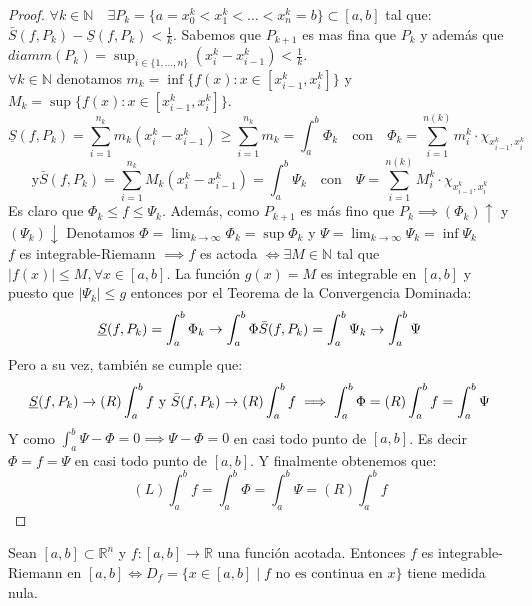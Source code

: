 \begin{proof}
    $\forall k \in \mathbb{N} \quad \exists P_k = \{ a = x_0^k < x_1^k < \dots < x_{n}^k = b \} \subset [a,b]$ tal que: $\bar{S}(f, P_k) - \underline{S}(f, P_k) < \frac{1}{k}$. 
    Sabemos que $P_{k+1}$ es mas fina que $P_{k}$ y además que $diamm(P_k) = \sup_{i \in \{1, \dots, n\}}(x_i^k - x_{i-1}^k) < \frac{1}{k}$.
    \\$\forall k \in \mathbb{N}$ denotamos $m_k = \inf\{f(x) : x \in [x_{i-1}^k, x_i^k]\}$ y $M_k = \sup\{f(x) : x \in [x_{i-1}^k, x_i^k]\}$.
    $$ \underline{S}(f, P_k) = \sum_{i=1}^{n_k}m_k(x_i^k - x_{i-1}^k) \geq \sum_{i=1}^{n_k}m_k = \int_{a}^{b}\Phi_k \quad \text{con} \quad \Phi_k = \sum_{i = 1}^{n(k)}m_i^k\cdot\chi_{x_{i-1}^k, x_i^k}$$ 
    $$\text{y} \bar{S}(f, P_k) = \sum_{i=1}^{n_k}M_k(x_i^k - x_{i-1}^k) = \int_{a}^{b} \Psi_k \quad \text{con}  \quad \Psi  = \sum_{i = 1}^{n(k)}M_i^k\cdot\chi_{x_{i-1}^k, x_i^k}$$ 
    Es claro que $\Phi_k  \leq f \leq \Psi_k$. 
    Además, como $P_{k+1}$ es más fino que $P_k \implies (\Phi_{k})\uparrow$ y $(\Psi_k)\downarrow$
    Denotamos $\Phi = \lim_{k \to \infty}\Phi_k = \sup\Phi_k$
    y $\Psi  = \lim_{k \to \infty}\Psi_k = \inf\Psi_k$
    \\$f$ es integrable-Riemann $\implies f$ es actoda $\iff \exists M \in \mathbb{N}$ tal que $|f(x)| \leq M, \forall x \in [a, b]$.
    La función  $ g(x) = M $ es integrable en $[a, b]$ y puesto que $|\Psi_k| \leq g$ entonces por el Teorema de la Convergencia Dominada: $$\underline{S}(f, P_{k}) = \int_{a}^{b}{\Phi_k} \to \int_{a}^{b}\Phi \\ \bar{S}(f, P_{k}) = \int_a^b\Psi_k \to \int_a^b\Psi$$
    Pero a su vez, también se cumple que: \\ $$\underline{S}(f, P_k) \to (R)\int_a^b f \text{ y } \\ \bar{S}(f, P_k) \to (R)\int_{a}^{b} f \implies \int_{a}^{b} \Phi = (R)\int_{a}^{b} f = \int_{a}^{b} \Psi$$
    Y como $\int_{a}^{b} \Psi - \Phi = 0 \implies \Psi - \Phi = 0$ en casi todo punto de $[a, b]$. Es decir $\Phi = f = \Psi$ en casi todo punto de $[a, b]$. Y finalmente obtenemos que: 
    $$(L)\int_{a}^{b}f = \int_{a}^{b}\Phi = \int_a^b\Psi = (R)\int_{a}^{b}f$$
\end{proof}
\begin{teorema}
    Sean $[a, b]\subset \mathbb{R}^n$ y $f: [a, b] \to \mathbb{R}$ una función acotada. Entonces $f$ es integrable-Riemann en $[a, b] \iff D_f = \{ x \in [a, b] \mid f \text{ no es continua en } x \}$ tiene medida nula.
\end{teorema}
